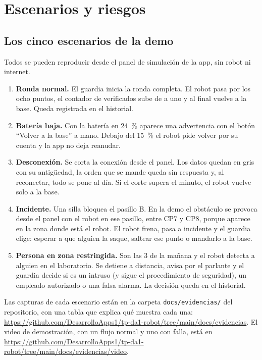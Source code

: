 \section{Escenarios y riesgos}
\label{sec:escenarios}

\subsection{Los cinco escenarios de la demo}

Todos se pueden reproducir desde el panel de simulación de la app, sin robot ni internet.

\begin{enumerate}
  \item \textbf{Ronda normal.} El guardia inicia la ronda completa. El robot pasa por los ocho puntos, el contador de verificados sube de a uno y al final vuelve a la base. Queda registrada en el historial.
  \item \textbf{Batería baja.} Con la batería en 24~\% aparece una advertencia con el botón ``Volver a la base'' a mano. Debajo del 15~\% el robot pide volver por su cuenta y la app no deja reanudar.
  \item \textbf{Desconexión.} Se corta la conexión desde el panel. Los datos quedan en gris con su antigüedad, la orden que se mande queda sin respuesta y, al reconectar, todo se pone al día. Si el corte supera el minuto, el robot vuelve solo a la base.
  \item \textbf{Incidente.} Una silla bloquea el pasillo B. En la demo el obstáculo se provoca desde el panel con el robot en ese pasillo, entre CP7 y CP8, porque aparece en la zona donde está el robot. El robot frena, pasa a incidente y el guardia elige: esperar a que alguien la saque, saltear ese punto o mandarlo a la base.
  \item \textbf{Persona en zona restringida.} Son las 3 de la mañana y el robot detecta a alguien en el laboratorio. Se detiene a distancia, avisa por el parlante y el guardia decide si es un intruso (y sigue el procedimiento de seguridad), un empleado autorizado o una falsa alarma. La decisión queda en el historial.
\end{enumerate}

Las capturas de cada escenario están en la carpeta \texttt{docs/evidencias/} del repositorio, con una tabla que explica qué muestra cada una: \url{https://github.com/DesarrolloApps1/tp-da1-robot/tree/main/docs/evidencias}. El video de demostración, con un flujo normal y uno con falla, está en \url{https://github.com/DesarrolloApps1/tp-da1-robot/tree/main/docs/evidencias/video}.


